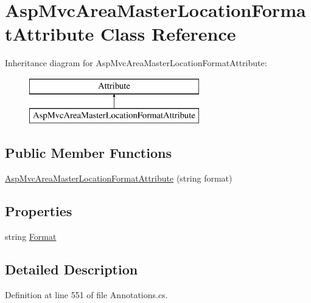\hypertarget{class_asp_mvc_area_master_location_format_attribute}{}\section{Asp\+Mvc\+Area\+Master\+Location\+Format\+Attribute Class Reference}
\label{class_asp_mvc_area_master_location_format_attribute}
Inheritance diagram for Asp\+Mvc\+Area\+Master\+Location\+Format\+Attribute\+:\begin{figure}[H]
\begin{center}
\leavevmode
\includegraphics[height=2.000000cm]{class_asp_mvc_area_master_location_format_attribute}
\end{center}
\end{figure}
\subsection*{Public Member Functions}
\begin{DoxyCompactItemize}
\item 
\hyperlink{class_asp_mvc_area_master_location_format_attribute_ab46b99bdef3d52b97af74a67590c2aab}{Asp\+Mvc\+Area\+Master\+Location\+Format\+Attribute} (string format)
\end{DoxyCompactItemize}
\subsection*{Properties}
\begin{DoxyCompactItemize}
\item 
string \hyperlink{class_asp_mvc_area_master_location_format_attribute_a4cb37b1a8f40ba0e5285cd1e602cf1c3}{Format}
\end{DoxyCompactItemize}


\subsection{Detailed Description}


Definition at line 551 of file Annotations.\+cs.



